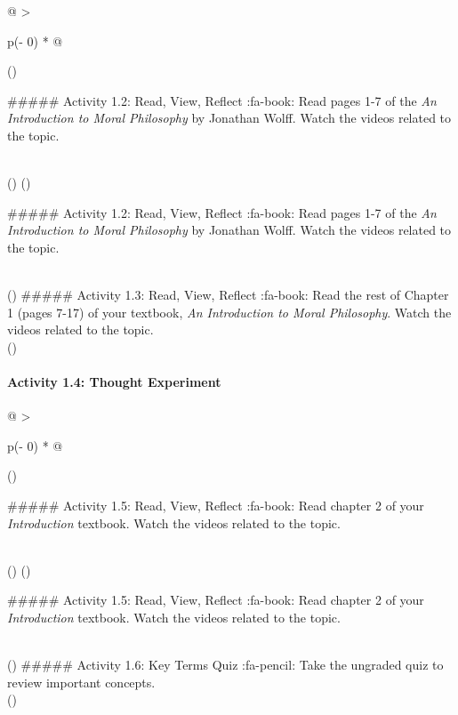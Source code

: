 \documentclass[
]{book}
\begin{document}
\begin{longtable}[]{@{}
  >{\raggedright\arraybackslash}p{(\columnwidth - 0\tabcolsep) * }@{}}
\caption{fa-pencil: Introduce yourself to your peers.}\tabularnewline
\toprule()
\begin{minipage}[b]{\linewidth}\raggedright
\#\#\#\#\# Activity 1.2: Read, View, Reflect
:fa-book: Read pages 1-7 of the \emph{An Introduction to Moral Philosophy} by Jonathan Wolff. Watch the videos related to the topic.
\end{minipage} \\
\midrule()
\endfirsthead
\toprule()
\begin{minipage}[b]{\linewidth}\raggedright
\#\#\#\#\# Activity 1.2: Read, View, Reflect
:fa-book: Read pages 1-7 of the \emph{An Introduction to Moral Philosophy} by Jonathan Wolff. Watch the videos related to the topic.
\end{minipage} \\
\midrule()
\endhead
\#\#\#\#\# Activity 1.3: Read, View, Reflect
:fa-book: Read the rest of Chapter 1 (pages 7-17) of your textbook, \emph{An Introduction to Moral Philosophy}. Watch the videos related to the topic. \\
\bottomrule()
\end{longtable}

\hypertarget{activity-1.4-thought-experiment}{%
\paragraph{Activity 1.4: Thought Experiment}\label{activity-1.4-thought-experiment}}

\begin{longtable}[]{@{}
  >{\raggedright\arraybackslash}p{(\columnwidth - 0\tabcolsep) * }@{}}
\caption{fa-book: Read and analyze the thought experiment on page 14 of the Wolff text.}\tabularnewline
\toprule()
\begin{minipage}[b]{\linewidth}\raggedright
\#\#\#\#\# Activity 1.5: Read, View, Reflect
:fa-book: Read chapter 2 of your \emph{Introduction} textbook. Watch the videos related to the topic.
\end{minipage} \\
\midrule()
\endfirsthead
\toprule()
\begin{minipage}[b]{\linewidth}\raggedright
\#\#\#\#\# Activity 1.5: Read, View, Reflect
:fa-book: Read chapter 2 of your \emph{Introduction} textbook. Watch the videos related to the topic.
\end{minipage} \\
\midrule()
\endhead
\#\#\#\#\# Activity 1.6: Key Terms Quiz
:fa-pencil: Take the ungraded quiz to review important concepts. \\
\bottomrule()
\end{longtable}
\end{document}
